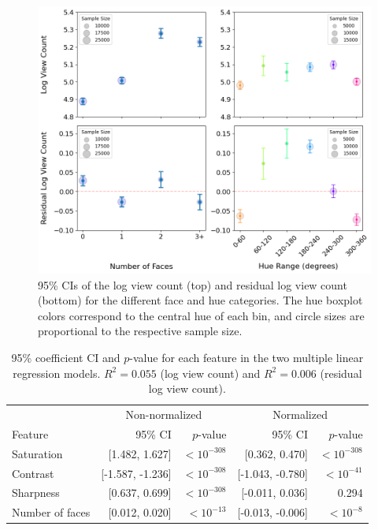 \documentclass{article}
\begin{document}
\begin{figure}[h]
  \begin{minipage}[t]{0.67\textwidth}
    \vspace{0pt}  %
    \includegraphics[width=\textwidth]{figs/faces-and-hue.png}
  \end{minipage}%
  \hspace{0.1\textwidth}%
  \begin{minipage}[t]{0.27\textwidth}
    \vspace{0pt}  %
    \caption{95\% CIs of the log view count (top) and residual log view count (bottom) for the different face and hue categories. The hue boxplot colors correspond to the central hue of each bin, and circle sizes are proportional to the respective sample size.}
    \label{fig:faces-and-hue}
  \end{minipage}
\end{figure}

\begin{table}[h]
\centering
\begin{tabular}{lrrrr}
\toprule
& \multicolumn{2}{c}{Non-normalized} & \multicolumn{2}{c}{Normalized} \\
\cmidrule(lr){2-3} \cmidrule(lr){4-5}
Feature & 95\% CI & $p$-value & 95\% CI & $p$-value \\
\midrule
Saturation & [1.482, 1.627] & $<10^{-308}$ & [0.362, 0.470] & $<10^{-308}$ \\

Contrast & [-1.587, -1.236] & $<10^{-308}$ & [-1.043, -0.780] & $<10^{-41}$ \\
Sharpness & [0.637, 0.699] & $<10^{-308}$ & [-0.011, 0.036] & 0.294 \\
Number of faces & [0.012, 0.020] & $<10^{-13}$ & [-0.013, -0.006] & $<10^{-8}$ \\
\bottomrule
\end{tabular}
\vspace{\baselineskip}
\caption{95\% coefficient CI and $p$-value for each feature in the two multiple linear regression models. $R^2 = 0.055$ (log view count) and $R^2 = 0.006$ (residual log view count).}
\label{tab:regression}
\end{table}
\end{document}
